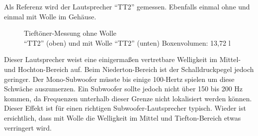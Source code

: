 \newpage
Als Referenz wird der Lautsprecher \enquote{TT2} gemessen. 
Ebenfalls einmal ohne und einmal mit Wolle im Gehäuse.
\begin{figure} [H]
	\centering
	\quad
	\caption{Tieftöner-Messung ohne Wolle\\ \enquote{TT2} (oben) und mit Wolle \enquote{TT2} (unten) Boxenvolumen: 13,72 l}
	\label{fig:5.3.4.2}
\end{figure}
Dieser Lautsprecher weist eine einigermaßen vertretbare Welligkeit im Mittel- und Hochton-Bereich auf.
Beim Niederton-Bereich ist der Schalldruckpegel jedoch geringer.
Der Mono-Subwoofer müsste bis einige 100-Hertz spielen um diese Schwäche auszumerzen.
Ein Subwoofer sollte jedoch nicht über 150 bis 200 Hz kommen, da Frequenzen unterhalb dieser Grenze nicht lokalisiert werden können.
Dieser Effekt ist für einen richtigen Subwoofer-Lautsprecher typisch.
Wieder ist ersichtlich, dass mit Wolle die Welligkeit im Mittel und Tiefton-Bereich etwas verringert wird.

